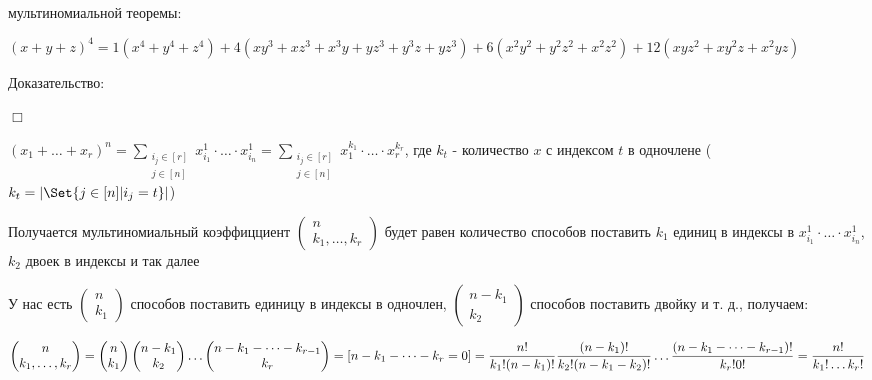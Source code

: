 \documentclass[12pt]{article}
\begin{document}
    \Ex мультиномиальной теоремы:

    $\displaystyle (x + y + z)^4 = 1 (x^4 + y^4 + z^4) + 4 (xy^3 + xz^3 + x^3y + yz^3 + y^3z + yz^3) +
    6(x^2y^2 + y^2z^2 + x^2z^2) + 12 (xyz^2 + xy^2z + x^2yz)$

    Доказательство:

    $\Box$

    $\displaystyle (x_1 + \dots + x_r)^n = \sum_{\substack{i_j \in [r] \\ j \in [n]}} x_{i_1}^1 \cdot \dots \cdot x_{i_n}^1 =
    \sum_{\substack{i_j \in [r] \\ j \in [n]}} x_1^{k_1} \cdot \dots \cdot x_r^{k_r}$, где $\displaystyle k_t$ - количество $x$ с индексом $t$ в одночлене ($\displaystyle k_t = |\Set{j \in [n] | i_j = t}|$)

    Получается мультиномиальный коэффицциент $\displaystyle \begin{pmatrix} n \\ k_1, \dots, k_r\end{pmatrix}$
    будет равен количество способов поставить $\displaystyle k_1$ единиц в индексы в $\displaystyle x_{i_1}^1 \cdot \dots \cdot x_{i_n}^1$, $\displaystyle k_2$ двоек в индексы и так далее

    У нас есть $\displaystyle \begin{pmatrix} n \\ k_1\end{pmatrix}$ способов поставить единицу в индексы в одночлен,
    $\displaystyle \begin{pmatrix} n - k_1 \\ k_2\end{pmatrix}$ способов поставить двойку и т. д., получаем:

    $\displaystyle \begin{pmatrix} n \\ k_1, \dots, k_r\end{pmatrix} = \begin{pmatrix} n \\ k_1\end{pmatrix} \begin{pmatrix} n - k_1 \\ k_2\end{pmatrix} \dots \begin{pmatrix} n - k_1 - \dots - k_{r - 1} \\ k_r\end{pmatrix} = [n - k_1 - \dots - k_r = 0] = \\
    \frac{n!}{k_1! (n - k_1)!} \frac{(n - k_1)!}{k_2! (n - k_1 - k_2)!} \dots \frac{(n - k_1 - \dots - k_{r - 1})!}{k_r! 0!} = \frac{n!}{k_1! \dots k_r!}$
\end{document}
